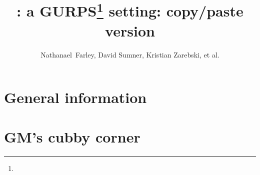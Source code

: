 \RequirePackage{cmap}





\onecolumn
\raggedright

\title{: a GURPS\thanks{}
  setting: copy/paste version}
\author{Nathanael~Farley, David Sumner, Kristian Zarebski, et al.}

\maketitle

\tableofcontents
\listoffigures


\part{General information}
\label{part:general-information}



\part{GM's cubby corner}
\label{part:gms-cubby-corner}





